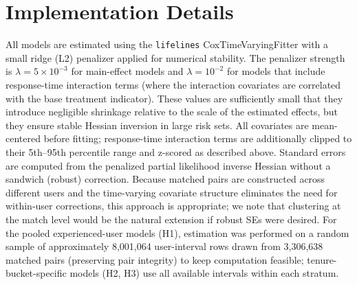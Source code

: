 \section{Implementation Details} All models are estimated using the \texttt{lifelines} CoxTimeVaryingFitter with a small ridge (L2) penalizer applied for numerical stability. The penalizer strength is $\lambda = 5 \times 10^{-3}$ for main-effect models and $\lambda = 10^{-2}$ for models that include response-time interaction terms (where the interaction covariates are correlated with the base treatment indicator). These values are sufficiently small that they introduce negligible shrinkage relative to the scale of the estimated effects, but they ensure stable Hessian inversion in large risk sets. All covariates are mean-centered before fitting; response-time interaction terms are additionally clipped to their 5th--95th percentile range and z-scored as described above. Standard errors are computed from the penalized partial likelihood inverse Hessian without a sandwich (robust) correction. Because matched pairs are constructed across different users and the time-varying covariate structure eliminates the need for within-user corrections, this approach is appropriate; we note that clustering at the match level would be the natural extension if robust SEs were desired. For the pooled experienced-user models (H1), estimation was performed on a random sample of approximately 8,001,064 user-interval rows drawn from 3,306,638 matched pairs (preserving pair integrity) to keep computation feasible; tenure-bucket-specific models (H2, H3) use all available intervals within each stratum.